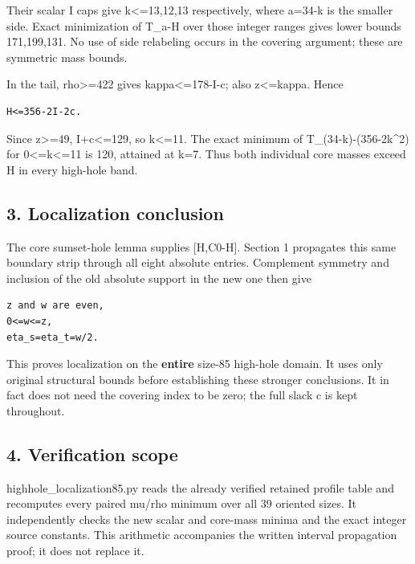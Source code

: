 \documentclass[10pt,a4paper]{article}
\theoremstyle{definition}
\begin{document}
Their scalar I caps give k\textless=\allowbreak{}13,\allowbreak{}12,\allowbreak{}13 respectively,\allowbreak{} where a=\allowbreak{}34-k
is the smaller side. Exact minimization of T\_\allowbreak{}a-H over those integer
ranges gives lower bounds 171,\allowbreak{}199,\allowbreak{}131. No use of side relabeling occurs
in the covering argument; these are symmetric mass bounds.

In the tail,\allowbreak{} rho\textgreater=\allowbreak{}422 gives kappa\textless=\allowbreak{}178-I-c; also
z\textless=\allowbreak{}kappa. Hence

\begin{lstlisting}
H<=356-2I-2c.
\end{lstlisting}

Since z\textgreater=\allowbreak{}49,\allowbreak{} I+\allowbreak{}c\textless=\allowbreak{}129,\allowbreak{} so k\textless=\allowbreak{}11. The exact
minimum of T\_\allowbreak{}(34-k)-(356-2k\^{}2) for 0\textless=\allowbreak{}k\textless=\allowbreak{}11 is 120,\allowbreak{}
attained at k=\allowbreak{}7. Thus both individual core masses exceed H in every
high-hole band.

\hypertarget{localization-conclusion}{%
\subsection{3. Localization conclusion}\label{localization-conclusion}}

The core sumset-hole lemma supplies {[}H,\allowbreak{}C0-H{]}. Section 1 propagates
this same boundary strip through all eight absolute entries. Complement
symmetry and inclusion of the old absolute support in the new one then
give

\begin{lstlisting}
z and w are even,
0<=w<=z,
eta_s=eta_t=w/2.
\end{lstlisting}

This proves localization on the \textbf{entire} size-85 high-hole
domain. It uses only original structural bounds before establishing
these stronger conclusions. It in fact does not need the covering index
to be zero; the full slack c is kept throughout.

\hypertarget{verification-scope}{%
\subsection{4. Verification scope}\label{verification-scope}}

highhole\_\allowbreak{}localization85.py reads the already verified retained profile
table and recomputes every paired mu/rho minimum over all 39 oriented
sizes. It independently checks the new scalar and core-mass minima and
the exact integer source constants. This arithmetic accompanies the
written interval propagation proof; it does not replace it.
\end{document}
